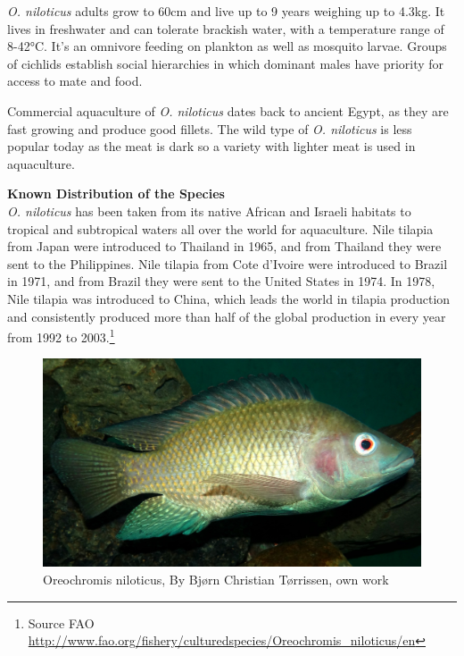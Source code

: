 \documentclass[]{book}
\let\rmarkdownfootnote\footnote%
\def\footnote{\protect\rmarkdownfootnote}
\theoremstyle{definition}
\theoremstyle{definition}
\theoremstyle{definition}
\theoremstyle{remark}
\begin{document}
\emph{O. niloticus} adults grow to 60cm and live up to 9 years weighing
up to 4.3kg. It lives in freshwater and can tolerate brackish water,
with a temperature range of 8-42°C. It's an omnivore feeding on plankton
as well as mosquito larvae. Groups of cichlids establish social
hierarchies in which dominant males have priority for access to mate and
food.

Commercial aquaculture of \emph{O. niloticus} dates back to ancient
Egypt, as they are fast growing and produce good fillets. The wild type
of \emph{O. niloticus} is less popular today as the meat is dark so a
variety with lighter meat is used in aquaculture.

\textbf{Known Distribution of the Species}\\
\emph{O. niloticus} has been taken from its native African and Israeli
habitats to tropical and subtropical waters all over the world for
aquaculture. Nile tilapia from Japan were introduced to Thailand in
1965, and from Thailand they were sent to the Philippines. Nile tilapia
from Cote d'Ivoire were introduced to Brazil in 1971, and from Brazil
they were sent to the United States in 1974. In 1978, Nile tilapia was
introduced to China, which leads the world in tilapia production and
consistently produced more than half of the global production in every
year from 1992 to 2003.\footnote{Source FAO
  \url{http://www.fao.org/fishery/culturedspecies/Oreochromis_niloticus/en}}

\begin{figure}

{\centering \includegraphics[width=44.56in]{images_species/Oreochromis-niloticus-Nairobi} 

}

\caption{Oreochromis niloticus, By Bjørn Christian Tørrissen, own work}\label{fig:unnamed-chunk-7}
\end{figure}
\end{document}
